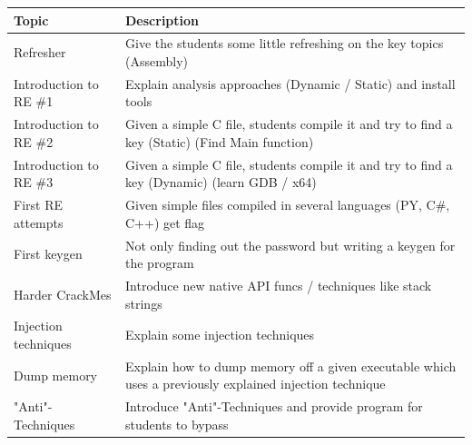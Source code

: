 \begin{center}
    \begin{tabular}{ |p{3cm}|p{12cm}| } 
        \hline
            Topic & 
            Description \\ [0.5ex] 
        \hline
        \hline
            Refresher & 
            Give the students some little refreshing on the key topics (Assembly)  \\ 
        \hline
            Introduction to RE \#1 & 
            Explain analysis approaches (Dynamic / Static) and install tools \\ 
        \hline
            Introduction to RE \#2 & 
            Given a simple C file, students compile it and try to find a key (Static) (Find Main function) \\ 
        \hline
            Introduction to RE \#3 & 
            Given a simple C file, students compile it and try to find a key (Dynamic) (learn GDB / x64) \\ 
        \hline
            First RE attempts & 
            Given simple files compiled in several languages (PY, C\#, C++) get flag \\ 
        \hline
            First keygen & 
            Not only finding out the password but writing a keygen for the program \\
        \hline
            Harder CrackMes & 
            Introduce new native API funcs / techniques like stack strings \\
        \hline
            Injection techniques & 
            Explain some injection techniques \\
        \hline
            Dump memory & 
            Explain how to dump memory off a given executable which uses a previously explained injection technique \\
        \hline
            "Anti"-Techniques & 
            Introduce "Anti"-Techniques and provide program for students to bypass \\
        \hline
    \end{tabular}
\end{center}